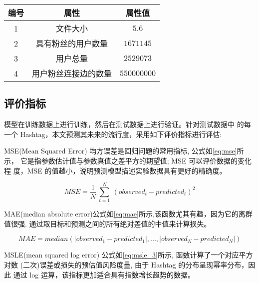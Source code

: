 \begin{table}[H]
    \centering
    \footnotesize%
      \label{tab:3_4}
    \setlength{\tabcolsep}{30pt}%
    \renewcommand{\arraystretch}{1.2}%
    \begin{tabular}{ccc}
        \hline
        \textbf{编号} & \textbf{属性} & \textbf{属性值}\\
        \hline
         1 &文件大小 & $5.6$ \\
         2 & 具有粉丝的用户数量 & $1671145$\\
         3 & 用户总量 & $2529073$ \\
         4 &用户粉丝连接边的数量& $550000000$ \\ 
        	\hline
    \end{tabular}
 
\end{table}



\subsection{评价指标}

模型在训练数据上进行训练，然后在测试数据上进行验证。针对测试数据中
的每一个 Hashtag，本文预测其未来的流行度，采用如下评价指标进行评估:

MSE(Mean Squared Error) 均方误差是回归问题的常用指标, 公式如\ref{eq:mse}所示， 它是指参数估计值与参数真值之差平方的期望值; MSE 可以评价数据的变化程 度，MSE 的值越小，说明预测模型描述实验数据具有更好的精确度。

 
\begin{equation}\label{eq:mse}
	MSE = \frac{1}{N} ~\sum_{t=1}^N~(observed_t - predicted_t)^2
\end{equation}

 
MAE(median absolute error)公式如\ref{eq:mae}所示,该函数尤其有趣，因为它的离群值很强. 通过取目标和预测之间的所有绝对差值的中值来计算损失。
  
  \begin{equation}\label{eq:mae}
  MAE = median(|observed_1 - predicted_1|,...,|observed_N - predicted_N|)
  \end{equation}
  
MSLE(mean squared log error) 公式如\ref{eq:msle_3}所示, 函数计算了一个对应平方对数 (二次)误差或损失的预估值风险度量, 由于 Hashtag 的分布呈现幂率分布，因此
通过 log 运算，该指标更加适合具有指数增长趋势的数据。
 
